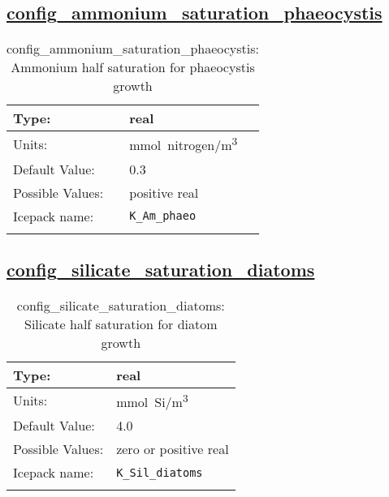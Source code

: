 \subsection[config\_ammonium\_saturation\_phaeocystis]{\hyperref[sec:nm_tab_biogeochemistry]{config\_ammonium\_saturation\_phaeocystis}}
\label{subsec:nm_sec_config_ammonium_saturation_phaeocystis}
\begin{center}
\begin{longtable}{| p{2.0in} || p{4.0in} |}
    \hline
    Type: & real \\
    \hline
    Units: & \si{mmol.nitrogen/m^3} \\
    \hline
    Default Value: & 0.3 \\
    \hline
    Possible Values: & positive real \\
    \hline
    \hline
    Icepack name: & \verb+K_Am_phaeo+ \\
    \caption{config\_ammonium\_saturation\_phaeocystis: Ammonium half saturation for phaeocystis growth}
\end{longtable}
\end{center}
\subsection[config\_silicate\_saturation\_diatoms]{\hyperref[sec:nm_tab_biogeochemistry]{config\_silicate\_saturation\_diatoms}}
\label{subsec:nm_sec_config_silicate_saturation_diatoms}
\begin{center}
\begin{longtable}{| p{2.0in} || p{4.0in} |}
    \hline
    Type: & real \\
    \hline
    Units: & \si{mmol.Si/m^3} \\
    \hline
    Default Value: & 4.0 \\
    \hline
    Possible Values: & zero or positive real \\
    \hline
    \hline
    Icepack name: & \verb+K_Sil_diatoms+ \\
    \caption{config\_silicate\_saturation\_diatoms: Silicate half saturation for diatom growth}
\end{longtable}
\end{center}
